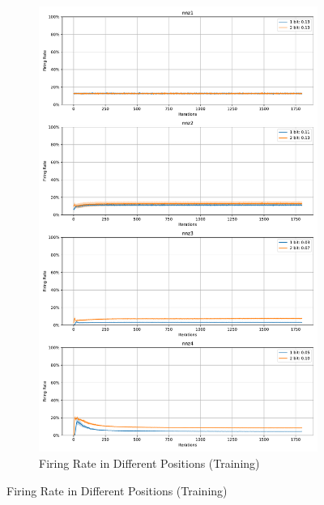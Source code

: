         \begin{figure}[H]
            \centering
            \begin{subfigure}[H]{0.8\textwidth}
                \centering
                \includegraphics[width=\textwidth]{../firerate/DVSGesture/plots/dvsgesture_train_firerate.pdf}
                \caption{Firing Rate in Different Positions (Training)}
            \end{subfigure}
        \end{figure}
